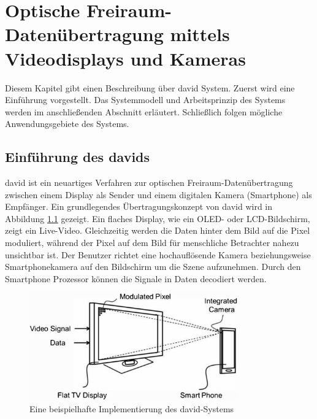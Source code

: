 \chapter{Optische Freiraum-Datenübertragung mittels Videodisplays und Kameras}


Diesem Kapitel gibt einen Beschreibung über \gls{david} System. Zuerst wird eine Einführung vorgestellt. Das Systemmodell und Arbeitsprinzip des Systems werden im anschließenden Abschnitt erläutert. Schließlich folgen mögliche Anwendungsgebiete des Systems. \cite{Kays2017,Kays2016,Kays201501,Kays201502}




\section{Einführung des \gls{david}s} 

\gls{david} ist ein neuartiges Verfahren zur optischen Freiraum-Datenübertragung zwischen einem Display als Sender und einem digitalen Kamera (Smartphone) als Empfänger. Ein grundlegendes Übertragungskonzept von \gls{david} wird in Abbildung \ref{fig:David1} gezeigt. Ein flaches Display, wie ein OLED- oder LCD-Bildschirm, zeigt ein Live-Video. Gleichzeitig werden die Daten hinter dem Bild auf die Pixel moduliert, während der Pixel auf dem Bild für menschliche Betrachter nahezu unsichtbar ist. Der Benutzer richtet eine hochauflösende Kamera beziehungsweise Smartphonekamera auf den Bildschirm um die Szene aufzunehmen. Durch den Smartphone Prozessor können die Signale  in Daten decodiert werden.

\begin{figure}[htb]
 \centering 
 \includegraphics[keepaspectratio,width=0.8\textwidth]{images/2_DaViD/David1.pdf}
 \caption{Eine beispielhafte Implementierung des \gls{david}-Systems}
 \label{fig:David1}
\end{figure}


